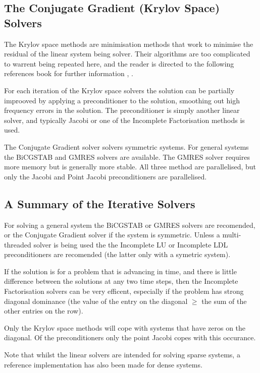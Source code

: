 \subsection{The Conjugate Gradient (Krylov Space) Solvers}\label{s4.3}

The Krylov space methods are minimisation methods that work to minimise the
residual of the linear system being solver. Their algorithms are too 
complicated to warrent being repeated here, and the reader is directed to the 
following references book for further information \cite{barrett:1993a},
\cite{shewchuk:1994a}.

For each iteration of the Krylov space solvers the solution can be partially 
improoved by applying a preconditioner to the solution, smoothing out high 
frequency errors in the solution. The preconditioner is simply another linear
solver, and typically Jacobi or one of the Incomplete Factorisation methods 
is used.

The Conjugate Gradient solver solvers symmetric systems. For general systems 
the BiCGSTAB and GMRES solvers are available. The GMRES solver requires more 
memory but is generally more stable. All three method are parallelised, but
only the Jacobi and Point Jacobi preconditioners are parallelised.


\subsection{A Summary of the Iterative Solvers}\label{s4.4}

For solving a general system the BiCGSTAB or GMRES solvers are recomended, 
or the Conjugate Gradient solver if the system is symmetric. Unless a
multi-threaded solver is being used the the Incomplete LU or Incomplete LDL
preconditioners are recomended (the latter only with a symetric system).

If the solution is for a problem that is advancing in time, and there is little
difference between the solutions at any two time steps, then the Incomplete 
Factorisation solvers can be very efficent, especially if the problem has
strong diagonal dominance (the value of the entry on the diagonal $\ge$ the sum
of the other entries on the row).

Only the Krylov space methods will cope with systems that have zeros on the 
diagonal. Of the preconditioners only the point Jacobi copes with this 
occurance.

Note that whilst the linear solvers are intended for solving sparse systems,
a reference implementation has also been made for dense systems.
